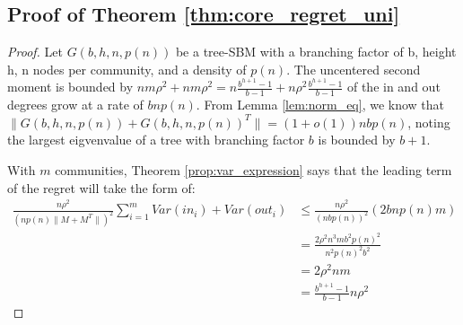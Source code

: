 \subsection{Proof of Theorem \ref{thm:core_regret_uni}}\label{proof:core_regret_uni}
\begin{proof} 
Let $G(b,h, n, p(n))$ be a tree-SBM with a branching factor of b, height h, n nodes per community, and a density of $p(n)$. The uncentered second moment is bounded by $n m \rho^2 + nm \rho^2 = n \frac{b^{h+1} -1}{b-1} + n \rho^2 \frac{b^{h+1} -1}{b-1}$ 
of the in and out degrees grow at a rate of $b n p(n)$. From Lemma \ref{lem:norm_eq}, we know that $\| G(b,h,n,p(n)) + G(b,h,n,p(n))^T\| = (1+o(1)) n b p(n) $, noting the largest eigvenvalue of a tree with branching factor $b$ is bounded by $b+1$. 

With $m$ communities, Theorem \ref{prop:var_expression} says that the leading term of the regret will take the form of:
\begin{align*}
     \frac{ n \rho^2}{ (n p(n) \|M+M^T\|)^2 } \sum_{i =1 }^{m} Var( in_i ) + Var(out_i) &\leq   \frac{ n \rho^2}{ (n b p(n) )^2 } \left(2 b  n p(n) m \right) \\
     &= \frac{2 \rho^2 n^3 m b^2 p(n)^2}{n^2 p(n)^2 b^2} \\
     &= 2 \rho^2 n m\\
     &= \frac{b^{h+1} -1 }{b-1} n \rho^2
\end{align*}
\end{proof}


